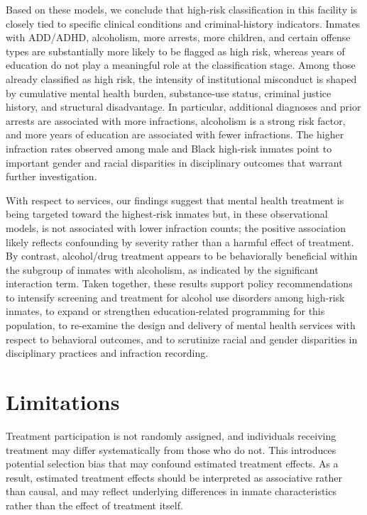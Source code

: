 \documentclass[
]{article}
\begin{document}
Based on these models, we conclude that high‑risk classification in this
facility is closely tied to specific clinical conditions and
criminal‑history indicators. Inmates with ADD/ADHD, alcoholism, more
arrests, more children, and certain offense types are substantially more
likely to be flagged as high risk, whereas years of education do not
play a meaningful role at the classification stage. Among those already
classified as high risk, the intensity of institutional misconduct is
shaped by cumulative mental health burden, substance‑use status,
criminal justice history, and structural disadvantage. In particular,
additional diagnoses and prior arrests are associated with more
infractions, alcoholism is a strong risk factor, and more years of
education are associated with fewer infractions. The higher infraction
rates observed among male and Black high‑risk inmates point to important
gender and racial disparities in disciplinary outcomes that warrant
further investigation.

With respect to services, our findings suggest that mental health
treatment is being targeted toward the highest‑risk inmates but, in
these observational models, is not associated with lower infraction
counts; the positive association likely reflects confounding by severity
rather than a harmful effect of treatment. By contrast, alcohol/drug
treatment appears to be behaviorally beneficial within the subgroup of
inmates with alcoholism, as indicated by the significant interaction
term. Taken together, these results support policy recommendations to
intensify screening and treatment for alcohol use disorders among
high‑risk inmates, to expand or strengthen education‑related programming
for this population, to re‑examine the design and delivery of mental
health services with respect to behavioral outcomes, and to scrutinize
racial and gender disparities in disciplinary practices and infraction
recording.

\section{Limitations}\label{limitations}

Treatment participation is not randomly assigned, and individuals
receiving treatment may differ systematically from those who do not.
This introduces potential selection bias that may confound estimated
treatment effects. As a result, estimated treatment effects should be
interpreted as associative rather than causal, and may reflect
underlying differences in inmate characteristics rather than the effect
of treatment itself.
\end{document}
